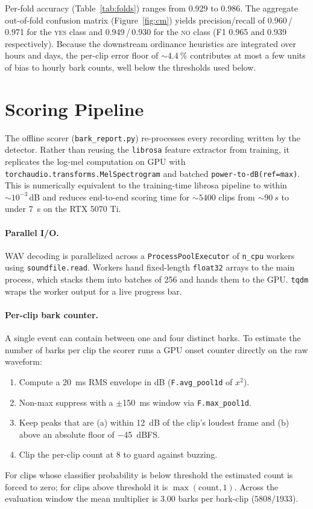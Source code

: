 \documentclass[10pt,twocolumn]{article}
\begin{document}
Per-fold accuracy (Table~\ref{tab:folds}) ranges from \num{0.929} to
\num{0.986}. The aggregate out-of-fold confusion matrix
(Figure~\ref{fig:cm}) yields precision/recall of
\num{0.960}\,/\,\num{0.971} for the \textsc{yes} class and
\num{0.949}\,/\,\num{0.930} for the \textsc{no} class (F1 \num{0.965}
and \num{0.939} respectively). Because the downstream ordinance
heuristics are integrated over hours and days, the per-clip error
floor of ${\sim}\SI{4.4}{\percent}$ contributes at most a few units
of bias to hourly bark counts, well below the thresholds used below.

\section{Scoring Pipeline}
The offline scorer (\texttt{bark\_report.py}) re-processes every
recording written by the detector. Rather than reusing the
\texttt{librosa} feature extractor from training, it replicates the
log-mel computation on GPU with
\texttt{torchaudio.transforms.MelSpectrogram} and batched
\texttt{power-to-dB(ref=max)}. This is numerically equivalent to the
training-time librosa pipeline to within ${\sim}10^{-3}$\,dB and
reduces end-to-end scoring time for ${\sim}5400$ clips from
${\sim}\SI{90}{s}$ to under \SI{7}{s} on the RTX 5070 Ti.

\paragraph{Parallel I/O.} WAV decoding is parallelized across a
\texttt{ProcessPoolExecutor} of \texttt{n\_cpu} workers using
\texttt{soundfile.read}. Workers hand fixed-length
\texttt{float32} arrays to the main process, which stacks them into
batches of \num{256} and hands them to the GPU. \texttt{tqdm} wraps
the worker output for a live progress bar.

\paragraph{Per-clip bark counter.} A single event can contain between
one and four distinct barks. To estimate the number of barks per clip
the scorer runs a GPU onset counter directly on the raw waveform:
\begin{enumerate}
  \item Compute a \SI{20}{ms} RMS envelope in dB
        (\texttt{F.avg\_pool1d} of $x^2$).
  \item Non-max suppress with a $\pm$\SI{150}{ms} window via
        \texttt{F.max\_pool1d}.
  \item Keep peaks that are (a) within \SI{12}{dB} of the clip's
        loudest frame and (b) above an absolute floor of
        \SI{-45}{dBFS}.
  \item Clip the per-clip count at \num{8} to guard against buzzing.
\end{enumerate}
For clips whose classifier probability is below threshold the estimated
count is forced to zero; for clips above threshold it is
$\max(\text{count},1)$. Across the evaluation window the mean
multiplier is \num{3.00} barks per bark-clip
($5808 / 1933$).
\end{document}
